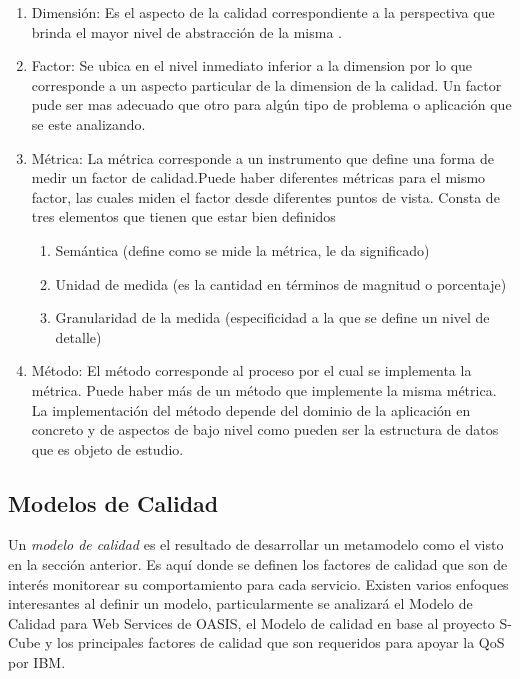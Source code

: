 			\begin{enumerate}
				\item Dimensión: Es el aspecto de la calidad correspondiente a la perspectiva que brinda el mayor nivel de abstracción de la misma \cite{InCo:Seminario}.
				\item Factor: Se ubica en el nivel inmediato inferior a la dimension por lo que corresponde a un aspecto particular de la dimension de la calidad. Un factor pude ser mas adecuado que otro para algún tipo de problema o aplicación que se este analizando.
				\item Métrica: La métrica corresponde a un instrumento que define una forma de medir un factor de calidad.\cite{InCo:Seminario}Puede haber diferentes métricas para el mismo factor, las cuales miden el factor desde diferentes puntos de vista. Consta de tres elementos que tienen que estar bien definidos
				\begin{enumerate}
				\item Semántica (define como se mide la métrica, le da significado)
				\item Unidad de medida (es la cantidad en términos de magnitud o porcentaje)
				\item Granularidad de la medida (especificidad a la que se define un nivel de detalle)
				\end{enumerate}
				\item Método: El método corresponde al proceso por el cual se implementa la métrica. Puede haber más de un método que implemente la misma métrica. La implementación del método depende del dominio de la aplicación en concreto y de aspectos de bajo nivel como pueden ser la estructura de datos que es objeto de estudio.
			\end{enumerate}


\subsection{Modelos de Calidad}
\label{MarcoConceptual:modelos_calidad}
Un \emph{modelo de calidad} es el resultado de desarrollar un metamodelo como el visto en la sección anterior. Es aquí donde se definen los factores de calidad que son de interés monitorear su comportamiento para cada servicio. Existen varios enfoques interesantes al definir un modelo, particularmente se analizará el Modelo de Calidad para Web Services de OASIS, el Modelo de calidad en base al proyecto S-Cube y los principales factores de calidad que son requeridos para apoyar la QoS por IBM.
